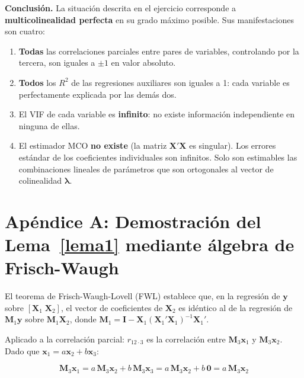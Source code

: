 \documentclass[12pt, letterpaper]{article}
\theoremstyle{remark}
\newcommand{\rp}[2]{r_{#1 \cdot #2}}   %
\begin{document}
\begin{clave}
  \textbf{Conclusión.} La situación descrita en el ejercicio corresponde a
  \textbf{multicolinealidad perfecta} en su grado máximo posible. Sus
  manifestaciones son cuatro:

  \begin{enumerate}[leftmargin=1.4em, itemsep=4pt]
    \item \textbf{Todas} las correlaciones parciales entre pares de variables,
      controlando por la tercera, son iguales a $\pm 1$ en valor absoluto.

    \item \textbf{Todos} los $R^2$ de las regresiones auxiliares son iguales a 1:
      cada variable es perfectamente explicada por las demás dos.

    \item El VIF de cada variable es \textbf{infinito}: no existe información
      independiente en ninguna de ellas.

    \item El estimador MCO \textbf{no existe} (la matriz $\mathbf{X'X}$ es
      singular). Los errores estándar de los coeficientes individuales son
      infinitos. Solo son estimables las combinaciones lineales de parámetros
      que son ortogonales al vector de colinealidad $\boldsymbol{\lambda}$.
  \end{enumerate}
\end{clave}

\appendix

\section{Apéndice A: Demostración del Lema~\ref{lema1} mediante álgebra de Frisch-Waugh}

El teorema de Frisch-Waugh-Lovell (FWL) establece que, en la regresión de $\mathbf{y}$
sobre $[\mathbf{X}_1\;\mathbf{X}_2]$, el vector de coeficientes de $\mathbf{X}_2$
es idéntico al de la regresión de $\mathbf{M}_1\mathbf{y}$ sobre
$\mathbf{M}_1\mathbf{X}_2$, donde $\mathbf{M}_1 = \mathbf{I} - \mathbf{X}_1(\mathbf{X}_1'\mathbf{X}_1)^{-1}\mathbf{X}_1'$.

Aplicado a la correlación parcial: $\rp{12}{3}$ es la correlación entre
$\mathbf{M}_3\mathbf{x}_1$ y $\mathbf{M}_3\mathbf{x}_2$. Dado que
$\mathbf{x}_1 = a\mathbf{x}_2 + b\mathbf{x}_3$:

\begin{equation}
  \mathbf{M}_3\mathbf{x}_1
    = a\,\mathbf{M}_3\mathbf{x}_2 + b\,\mathbf{M}_3\mathbf{x}_3
    = a\,\mathbf{M}_3\mathbf{x}_2 + b\,\mathbf{0}
    = a\,\mathbf{M}_3\mathbf{x}_2
  \label{eq:fwl}
\end{equation}
\end{document}
